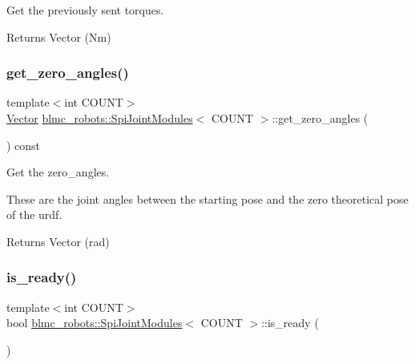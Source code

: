Get the previously sent torques. 

\begin{DoxyReturn}{Returns}
Vector (Nm) 
\end{DoxyReturn}
\mbox{\label{classblmc__robots_1_1SpiJointModules_a601fccbb1fda008282729b7bd1cf2e08}} 
\subsubsection{\texorpdfstring{get\+\_\+zero\+\_\+angles()}{get\_zero\_angles()}}
{\footnotesize\ttfamily template$<$int C\+O\+U\+NT$>$ \\
\hyperlink{classblmc__robots_1_1SpiJointModules_a2d48f81ec41a42a240e80cd22d4fa2f8}{Vector} \hyperlink{classblmc__robots_1_1SpiJointModules}{blmc\+\_\+robots\+::\+Spi\+Joint\+Modules}$<$ C\+O\+U\+NT $>$\+::get\+\_\+zero\+\_\+angles (\begin{DoxyParamCaption}{ }\end{DoxyParamCaption}) const\hspace{0.3cm}{\ttfamily [inline]}}



Get the zero\+\_\+angles. 

These are the joint angles between the starting pose and the zero theoretical pose of the urdf.

\begin{DoxyReturn}{Returns}
Vector (rad) 
\end{DoxyReturn}
\mbox{\label{classblmc__robots_1_1SpiJointModules_a100d408ad8452cddde9c053cc33e8b3b}} 
\subsubsection{\texorpdfstring{is\+\_\+ready()}{is\_ready()}}
{\footnotesize\ttfamily template$<$int C\+O\+U\+NT$>$ \\
bool \hyperlink{classblmc__robots_1_1SpiJointModules}{blmc\+\_\+robots\+::\+Spi\+Joint\+Modules}$<$ C\+O\+U\+NT $>$\+::is\+\_\+ready (\begin{DoxyParamCaption}{ }\end{DoxyParamCaption})\hspace{0.3cm}{\ttfamily [inline]}}



